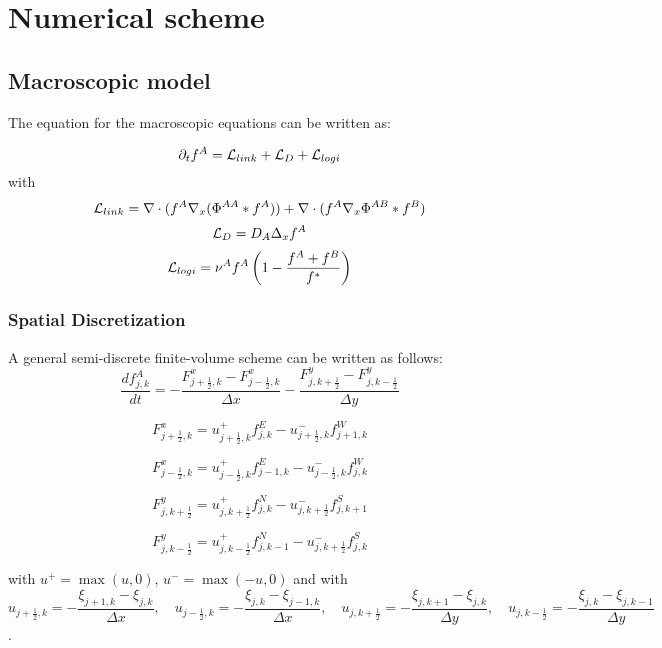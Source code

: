 	\section{Numerical scheme}
	\subsection{Macroscopic model}
	
The equation for the macroscopic equations can be written as:

\begin{equation}
 {\partial}_t f^{A}={\mathcal{L}_{link}}+{\mathcal{L}_{D}}+{\mathcal{L}_{logi}}
\end{equation}
with
\begin{equation}
{\mathcal{L}_{link}}=  \nabla \cdot (f^A\nabla_x(\Phi^{AA}* f^A)) + \nabla \cdot (f^A \nabla_x \Phi^{AB}*f^B)
\end{equation}
\begin{equation}
{\mathcal{L}_{D}}= D_A \Delta_x f^A
\end{equation}
\begin{equation}
{\mathcal{L}_{logi}}=\nu^{A}f^A\left( 1-\frac{f^A+f^B}{f^{*}} \right)
\end{equation}


\subsubsection{Spatial Discretization}


A general semi-discrete finite-volume scheme can be written as follows:
\begin{equation}
\frac{d f^{A}_{j,k}}{dt}= -\frac{F^{x}_{j+\frac{1}{2},k}-F^{x}_{j-\frac{1}{2},k}}{\Delta x}-\frac{F^{y}_{j,k+\frac{1}{2}}-F^{y}_{j,k-\frac{1}{2}}}{\Delta y}
\end{equation}

$$ F^{x}_{j+\frac{1}{2},k}=u^{+}_{j+\frac{1}{2},k}f^{E}_{j,k}-
u^{-}_{j+\frac{1}{2},k}f^{W}_{j+1,k}   $$

$$ F^{x}_{j-\frac{1}{2},k}=u^{+}_{j-\frac{1}{2},k}f^{E}_{j-1,k}-
u^{-}_{j-\frac{1}{2},k}f^{W}_{j,k}   $$

$$ F^{y}_{j,k+\frac{1}{2}}=u^{+}_{j,k+\frac{1}{2}}f^{N}_{j,k}-
u^{-}_{j,k+\frac{1}{2}}f^{S}_{j,k+1}   $$

$$ F^{y}_{j,k-\frac{1}{2}}=u^{+}_{j,k-\frac{1}{2}}f^{N}_{j,k-1}-
u^{-}_{j,k+\frac{1}{2}}f^{S}_{j,k}   $$

with $u^{+}=\max(u,0)$, $u^{-}=\max(-u,0)$ and with $$u_{j+\frac{1}{2},k}=-\frac{\xi_{j+1,k}-\xi_{j,k}}{\Delta x}, \quad u_{j-\frac{1}{2},k}=-\frac{\xi_{j,k}-\xi_{j-1,k}}{\Delta x}, \quad u_{j,k+\frac{1}{2}}=-\frac{\xi_{j,k+1}-\xi_{j,k}}{\Delta y}, \quad u_{j,k-\frac{1}{2}}=-\frac{\xi_{j,k}-\xi_{j,k-1}}{\Delta y}$$. \\

